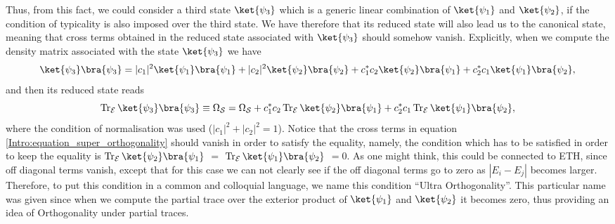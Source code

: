 Thus, from this fact, we could consider a third state $\ket{\psi_3}$ which is a generic linear combination of $\ket{\psi_1}$ and $\ket{\psi_2}$, if the condition of typicality is also imposed over the third state. We have therefore that its reduced state will also lead us to the canonical state, meaning that cross terms obtained in the reduced state associated with $\ket{\psi_3}$ should somehow vanish. Explicitly, when we compute the density matrix associated with the state $\ket{\psi_3}$ we have 
\begin{equation}
\ket{\psi_3}\bra{\psi_3} = |c_1|^2 \ket{\psi_1}\bra{\psi_1} + |c_2|^2 \ket{\psi_2}\bra{\psi_2}+c_1^*c_2\ket{\psi_2}\bra{\psi_1} + c_2^*c_1\ket{\psi_1}\bra{\psi_2},
\end{equation}
and then its reduced state reads
\begin{equation}
\operatorname{Tr}_{\mathcal{E}}\ket{\psi_3}\bra{\psi_3} \equiv \Omega_{\mathcal{S}}= \Omega_{\mathcal{S}}+c_1^*c_2\operatorname{Tr}_{\mathcal{E}}\ket{\psi_2}\bra{\psi_1} + c_2^*c_1\operatorname{Tr}_{\mathcal{E}}\ket{\psi_1}\bra{\psi_2},
\label{Intro:equation_super_orthogonality}
\end{equation}
where the condition of normalisation was used ($|c_1|^2 + |c_2|^2 =1$). Notice that the cross terms in equation \eqref{Intro:equation_super_orthogonality} should vanish in order to satisfy the equality, namely, the condition which has to be satisfied in order to keep the equality is $\operatorname{Tr}_{\mathcal{E}}\ket{\psi_2}\bra{\psi_1}$ $=$ $\operatorname{Tr}_{\mathcal{E}}\ket{\psi_1}\bra{\psi_2}$ $=0$. As one might think, this could be connected to ETH, since off diagonal terms vanish, except that for this case we can not clearly see if the off diagonal terms go to zero as $|E_i-E_j|$ becomes larger. Therefore, to put this condition in a common and colloquial language, we name this condition ``Ultra Orthogonality''. This particular name was given since when we compute the partial trace over the exterior product of $\ket{\psi_1}$ and $\ket{\psi_2}$ it becomes zero, thus providing an idea of Orthogonality under partial traces.\\

